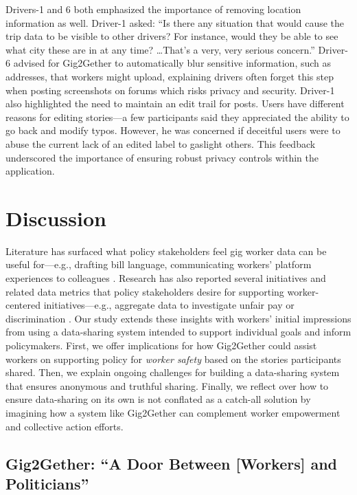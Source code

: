 Drivers-1 and 6 both emphasized the importance of removing location information as well. Driver-1 asked: ``Is there any situation that would cause the trip data to be visible to other drivers? For instance, would they be able to see what city these are in at any time? \dots That's a very, very serious concern.'' Driver-6 advised for Gig2Gether to automatically blur sensitive information, such as addresses, that workers might upload, explaining drivers often forget this step when posting screenshots on forums which risks privacy and security. Driver-1 also highlighted the need to maintain an edit trail for posts. Users have different reasons for editing stories---a few participants said they appreciated the ability to go back and modify typos. However, he was concerned if deceitful users were to abuse the current lack of an edited label to gaslight others.
This feedback underscored the importance of ensuring robust privacy controls within the application. 

\section{Discussion}

{Literature has surfaced what policy stakeholders feel gig worker data can be useful for---e.g., drafting bill language, communicating workers' platform experiences to colleagues \cite{policy_probes}. Research has also reported several initiatives and related data metrics that policy stakeholders desire for supporting worker-centered initiatives---e.g., aggregate data to investigate unfair pay or discrimination \cite{supporting}. Our study extends these insights with workers' initial impressions from using a data-sharing system intended to support individual goals and inform policymakers. First, we offer implications for how Gig2Gether could assist workers on supporting policy for \textit{worker safety} based on the stories participants shared. Then, we explain ongoing challenges for building a data-sharing system that ensures anonymous and truthful sharing. Finally, we reflect over how to ensure data-sharing on its own is not conflated as a catch-all solution by imagining how a system like Gig2Gether can complement worker empowerment and collective action efforts.

}
\subsection{Gig2Gether: ``A Door Between [Workers] and Politicians''} \label{door}

